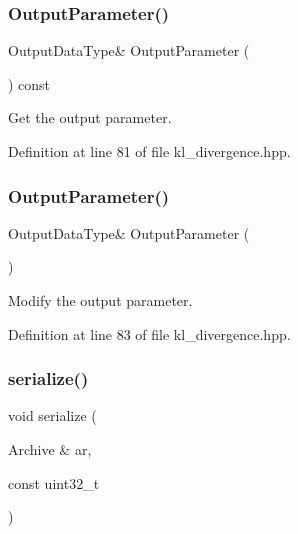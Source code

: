 \subsubsection{Output\+Parameter()\hspace{0.1cm}{\footnotesize\ttfamily [1/2]}}
{\footnotesize\ttfamily Output\+Data\+Type\& Output\+Parameter (\begin{DoxyParamCaption}{ }\end{DoxyParamCaption}) const\hspace{0.3cm}{\ttfamily [inline]}}



Get the output parameter. 



Definition at line 81 of file kl\+\_\+divergence.\+hpp.

\mbox{\label{classmlpack_1_1ann_1_1KLDivergence_a21d5f745f02c709625a4ee0907f004a5}} 
\subsubsection{Output\+Parameter()\hspace{0.1cm}{\footnotesize\ttfamily [2/2]}}
{\footnotesize\ttfamily Output\+Data\+Type\& Output\+Parameter (\begin{DoxyParamCaption}{ }\end{DoxyParamCaption})\hspace{0.3cm}{\ttfamily [inline]}}



Modify the output parameter. 



Definition at line 83 of file kl\+\_\+divergence.\+hpp.

\mbox{\label{classmlpack_1_1ann_1_1KLDivergence_a65cba07328997659bec80b9879b15a51}} 
\subsubsection{serialize()}
{\footnotesize\ttfamily void serialize (\begin{DoxyParamCaption}\item[{Archive \&}]{ar,  }\item[{const uint32\+\_\+t}]{ }\end{DoxyParamCaption})}



